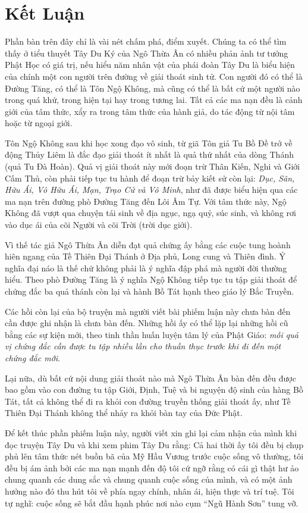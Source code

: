 \chapter{Kết Luận} %
\label{cha:ket_luan}

Phần bàn trên đây chỉ là vài nét chấm phá, điểm xuyết. Chúng ta có thể tìm thấy ở tiểu thuyết Tây Du Ký của Ngô Thừa Ân có nhiều phản ảnh tư tưởng Phật Học có giá trị, nếu hiểu năm nhân vật của phái đoàn Tây Du là biểu hiện của chính một con người trên đường về giải thoát sinh tử. Con người đó có thể là Đường Tăng, có thể là Tôn Ngộ Không, mà cũng có thể là bất cứ một người nào trong quá khứ, trong hiện tại hay trong tương lai. Tất cả các ma nạn đều là cảnh giới của tâm thức, xẩy ra trong tâm thức của hành giả, do tác động từ nội tâm hoặc từ ngoại giới.

Tôn Ngộ Không sau khi học xong đạo vô sinh, từ giã Tôn giả Tu Bồ Đề trở về động Thủy Liêm là đắc đạo giải thoát ít nhất là quả thứ nhất của dòng Thánh (quả Tu Đà Hoàn). Quả vị giải thoát này mới đoạn trừ Thân Kiến, Nghi và Giới Cấm Thủ, còn phải tiếp tục tu hành để đoạn trừ bảy kiết sử còn lại: \emph{Dục, Sân, Hữu Ái, Vô Hữu Ái, Mạn, Trạo Cử và Vô Minh}, như đã được biểu hiện qua các ma nạn trên đường phò Đường Tăng đến Lôi Âm Tự. Với tâm thức này, Ngộ Không đã vượt qua chuyện tái sinh về địa ngục, ngạ quỷ, súc sinh, và không rơi vào dục ái của cõi Người và cõi Trời (trời dục giới).

Vì thế tác giả Ngô Thừa Ân diễn đạt quả chứng ấy bằng các cuộc tung hoành hiên ngang của Tề Thiên Đại Thánh ở Địa phủ, Long cung và Thiên đình. Ý nghĩa đại náo là thế chứ không phải là ý nghĩa đập phá mà người đời thường hiểu. Theo phò Đường Tăng là ý nghĩa Ngộ Không tiếp tục tu tập giải thoát để chứng đắc ba quả thánh còn lại và hành Bồ Tát hạnh theo giáo lý Bắc Truyền.

Các hồi còn lại của bộ truyện mà người viết bài phiếm luận này chưa bàn đến cần được ghi nhận là chưa bàn đến. Những hồi ấy có thể lặp lại những hồi cũ bằng các sự kiện mới, theo tinh thần huấn luyện tâm lý của Phật Giáo: \emph{mỗi quả vị chứng đắc cần được tu tập nhiều lần cho thuần thục trước khi đi đến một chứng đắc mới}.

Lại nữa, dù bất cứ nội dung giải thoát nào mà Ngô Thừa Ân bàn đến đều được bao gồm vào con đường tu tập Giới, Định, Tuệ và bi nguyện độ sinh của hàng Bồ Tát, tất cả không thể đi ra khỏi con đường truyền thống giải thoát ấy, như Tề Thiên Đại Thánh không thể nhảy ra khỏi bàn tay của Đức Phật.

Để kết thúc phần phiếm luận này, người viết xin ghi lại cảm nhận của mình khi đọc truyện Tây Du và khi xem phim Tây Du rằng: Cả hai thời ấy tôi đều bị chụp phủ lên tâm thức nét buồn bã của Mỹ Hầu Vương trước cuộc sống vô thường, tôi đều bị ám ảnh bởi các ma nạn mạnh đến độ tôi cứ ngỡ rằng có cái gì thật hư ảo chung quanh các dung sắc và chung quanh cuộc sống của mình, và có một ảnh hưởng nào đó thu hút tôi về phía ngay chính, nhân ái, hiện thực và trí tuệ. Tôi tự nghĩ: cuộc sống sẽ bắt đầu hạnh phúc nơi nào cụm ``Ngũ Hành Sơn'' tung vỡ.
